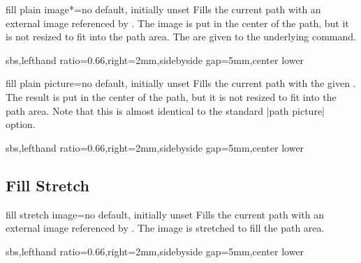 \documentclass[a4paper,11pt]{article}
\begin{document}
\begin{docTikzKey}{fill plain image*}{=}{no default, initially unset}
  Fills the current path with an external image referenced by .
  The image is put in the center of the path, but it is not resized to fit into
  the path area.
  The  are given to the underlying  command.
\begin{dispExample*}{sbs,lefthand ratio=0.66,right=2mm,sidebyside gap=5mm,center lower}
\end{dispExample*}
\end{docTikzKey}

\enlargethispage*{8mm}

\begin{docTikzKey}{fill plain picture}{=}{no default, initially unset}
  Fills the current path with the given .
  The result is put in the center of the path, but it is not resized to fit into
  the path area. Note that this is almost identical to the standard |path picture| option.
\begin{dispExample*}{sbs,lefthand ratio=0.66,right=2mm,sidebyside gap=5mm,center lower}
\end{dispExample*}
\end{docTikzKey}


\clearpage
\subsection{Fill Stretch}
\begin{docTikzKey}{fill stretch image}{=}{no default, initially unset}
  Fills the current path with an external image referenced by .
  The image is stretched to fill the path area.
\begin{dispExample*}{sbs,lefthand ratio=0.66,right=2mm,sidebyside gap=5mm,center lower}
\end{dispExample*}
\end{docTikzKey}
\end{document}
